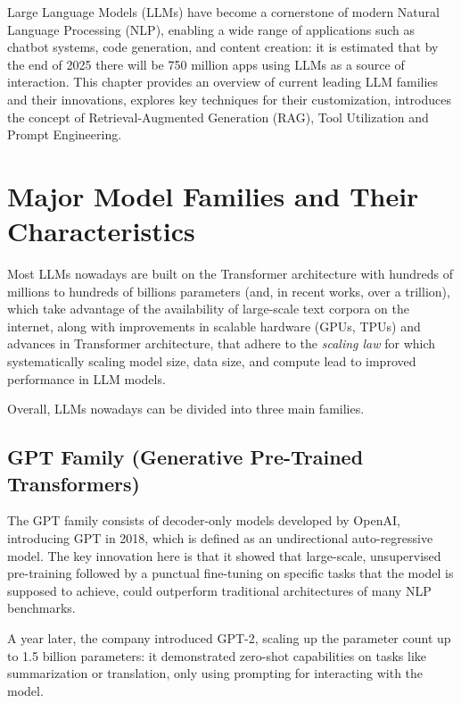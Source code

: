 Large Language Models (LLMs) have become a cornerstone of modern Natural Language Processing (NLP), enabling a wide range of applications such as chatbot systems, code generation, and content creation: it is estimated that by the end of 2025 there will be 750 million apps using LLMs as a source of interaction. \cite{uspenskyi2025} This chapter provides an overview of current leading LLM families and their innovations, explores key techniques for their customization, introduces the concept of Retrieval-Augmented Generation (RAG), Tool Utilization and Prompt Engineering.


\section{Major Model Families and Their Characteristics}
\label{sec:major-models}

Most LLMs nowadays are built on the Transformer architecture with hundreds of millions to hundreds of billions parameters (and, in recent works, over a trillion), which take advantage of the availability of large-scale text corpora on the internet, along with improvements in scalable hardware (GPUs, TPUs) and advances in Transformer architecture, that adhere to the \textit{scaling law} \cite{kaplan2020scaling} for which systematically scaling model size, data size, and compute lead to improved performance in LLM models. 

Overall, LLMs nowadays can be divided into three main families. \cite{minaee2024largelanguagemodelssurvey}


\subsection{GPT Family (Generative Pre-Trained Transformers)}

The GPT family consists of decoder-only models developed by OpenAI, introducing GPT in 2018, which is defined as an undirectional auto-regressive model. The key innovation here is that it showed that large-scale, unsupervised pre-training followed by a punctual fine-tuning on specific tasks that the model is supposed to achieve, could outperform traditional architectures of many NLP benchmarks.

A year later, the company introduced GPT-2, scaling up the parameter count up to 1.5 billion parameters: it demonstrated zero-shot capabilities on tasks like summarization or translation, only using prompting for interacting with the model.

